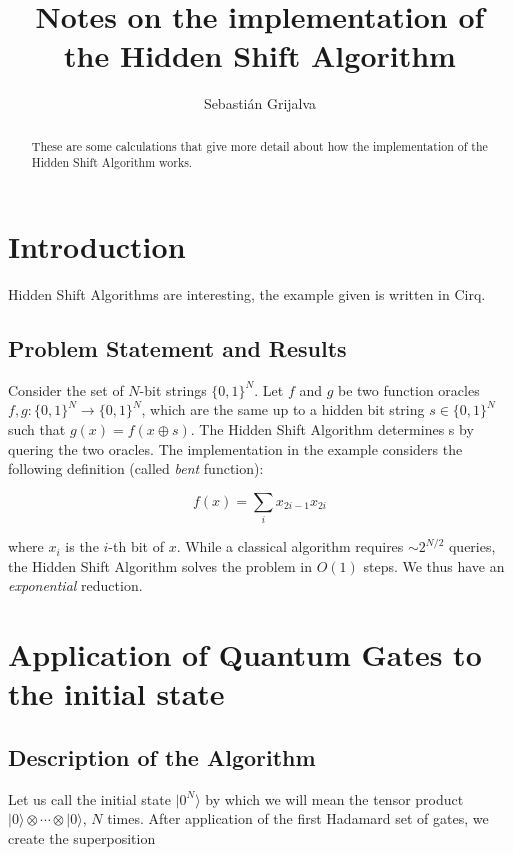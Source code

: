 \documentclass[letterpaper,onecolumn]{quantumarticle}
\newcommand{\be}{\begin{equation}}
\newcommand{\ee}{\end{equation}}
\begin{document}
\title{Notes on the implementation of the Hidden Shift Algorithm}

\author{Sebastián Grijalva}

\begin{abstract}
These are some calculations that give more detail about how the implementation of the Hidden Shift Algorithm works.
\end{abstract}
\maketitle

\section{Introduction}

Hidden Shift Algorithms are interesting, the example given is written in \textsf{Cirq}.


\subsection{Problem Statement and Results}

Consider the set of $N$-bit strings $\{0,1\}^N$. Let $f$ and $g$ be two function oracles $f,g : \{0,1\}^N \to \{0,1\}^N$, which are the same up to a hidden bit string $s \in \{0,1\}^N$ such that $g(x) = f(x \oplus s)$. The Hidden Shift Algorithm determines s by quering the two oracles. The 
implementation in the example considers the following definition (called \emph{bent} function):

\be 
\label{oracle}
f(x) = \sum_i x_{2i-1} x_{2i}
\ee

where $x_i$ is the $i$-th bit of $x$. While a classical algorithm requires $\sim 2^{N/2}$ queries, the Hidden Shift 
Algorithm solves the problem in $O(1)$ steps. We thus have an \emph{exponential}
reduction.


\section{Application of Quantum Gates to the initial state}
\label{gates}

\subsection{Description of the Algorithm}

Let us call the initial state $|0^N\rangle$ by which we will mean the tensor product $|0\rangle \otimes \cdots \otimes |0\rangle$, $N$ times. After application of the first Hadamard set of gates, we create the superposition 
\end{document}
